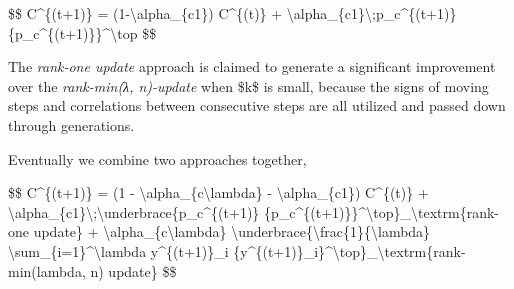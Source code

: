 \$\$ C\^{}\{(t+1)\} = (1-\textbackslash alpha\_\{c1\}) C\^{}\{(t)\} + \textbackslash alpha\_\{c1\}\textbackslash;p\_c\^{}\{(t+1)\} \{p\_c\^{}\{(t+1)\}\}\^{}\textbackslash top \$\$

The \emph{rank-one update} approach is claimed to generate a significant improvement over the \emph{rank-min(λ, n)-update} when \$k\$ is small, because the signs of moving steps and correlations between consecutive steps are all utilized and passed down through generations.

Eventually we combine two approaches together,

\$\$ C\^{}\{(t+1)\} = (1 - \textbackslash alpha\_\{c\textbackslash lambda\} - \textbackslash alpha\_\{c1\}) C\^{}\{(t)\} + \textbackslash alpha\_\{c1\}\textbackslash;\textbackslash underbrace\{p\_c\^{}\{(t+1)\} \{p\_c\^{}\{(t+1)\}\}\^{}\textbackslash top\}\_\textbackslash textrm\{rank-one update\} + \textbackslash alpha\_\{c\textbackslash lambda\} \textbackslash underbrace\{\textbackslash frac\{1\}\{\textbackslash lambda\} \textbackslash sum\_\{i=1\}\^{}\textbackslash lambda y\^{}\{(t+1)\}\_i \{y\^{}\{(t+1)\}\_i\}\^{}\textbackslash top\}\_\textbackslash textrm\{rank-min(lambda, n) update\} \$\$

